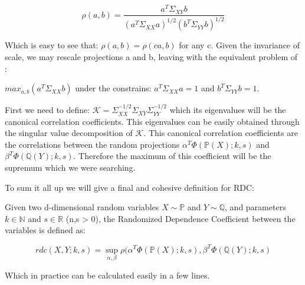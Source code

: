 $$\rho(a,b) = \frac{a^{T}\Sigma_{XY}b}{(a^{T}\Sigma_{XX}a)^{1/2}(b^{T}\Sigma_{YY}b)^{1/2}}$$

Which is easy to see that:
$\rho(a,b) = \rho(ca,b)$ for any c. Given the invariance of scale, we may rescale projections a and b, leaving with the equivalent problem of :

$max_{a,b}(a^{T}\Sigma_{XX}b)$ under the constrains: $a^{T}\Sigma_{XX}a = 1$ and $b^{T}\Sigma_{YY}b = 1$.

First we need to define:
$\mathcal{K} = \Sigma_{XX}^{-1/2}\Sigma_{XY}\Sigma_{YY}^{-1/2}$
which its eigenvalues will be the canonical correlation coefficients. This eigenvalues can be easily obtained through the singular value decomposition of $\mathcal{K}$. 
This canonical correlation coefficients are the correlations between the random projections $\alpha^{T}\Phi(\mathbb{P}(X);k,s)$ and $\beta^{T} \Phi(\mathbb{Q}(Y);k,s)$. Therefore the maximum of this coefficient will be the supremum which we were searching.

To sum it all up we will give a final and cohesive definition for RDC:

\begin{defn}
Given two d-dimensional random variables $X\sim\mathbb{P}$ and $Y\sim\mathbb{Q}$, and parameters $k\in \mathbb{N}$ and $s\in \mathbb{R}$ (n,s > 0), the Randomized Dependence Coefficient between the variables is defined as:

$$
rdc(X,Y;k,s) = \sup_{\alpha,\beta}\rho(\alpha^{T}\Phi(\mathbb{P}(X);k,s),\beta^{T} \Phi(\mathbb{Q}(Y);k,s)
$$
\end{defn}
Which in practice can be calculated easily in a few lines. 